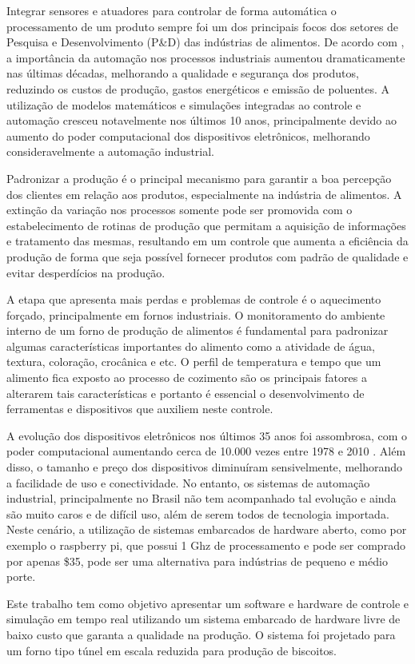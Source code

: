 Integrar sensores e atuadores para controlar de forma automática o processamento de um produto sempre foi um dos principais focos dos setores de Pesquisa e Desenvolvimento (P\&D) das indústrias de alimentos. De acordo com \citet{future-trends}, a importância da automação nos processos industriais aumentou dramaticamente nas últimas décadas, melhorando a qualidade e segurança dos produtos, reduzindo os custos de produção, gastos energéticos e emissão de poluentes. A utilização de modelos matemáticos e simulações integradas ao controle e automação cresceu notavelmente nos últimos 10 anos, principalmente devido ao aumento do poder computacional dos dispositivos eletrônicos, melhorando consideravelmente a automação industrial.

Padronizar a produção é o principal mecanismo para garantir a boa percepção dos clientes em relação aos produtos, especialmente na indústria de alimentos. A extinção da variação nos processos somente pode ser promovida com o estabelecimento de rotinas de produção que permitam a aquisição de informações e tratamento das mesmas, resultando em um controle que aumenta a eficiência da produção de forma que seja possível fornecer produtos com padrão de qualidade e evitar desperdícios na produção.

A etapa que apresenta mais perdas e problemas de controle é o aquecimento forçado, principalmente em fornos industriais. O monitoramento do ambiente interno de um forno de produção de alimentos é fundamental para padronizar algumas características importantes do alimento como a atividade de água, textura, coloração, crocânica e etc. O perfil de temperatura e tempo que um alimento fica exposto ao processo de cozimento são os principais fatores a alterarem tais características e portanto é essencial o desenvolvimento de ferramentas e dispositivos que auxiliem neste controle.

	A evolução dos dispositivos eletrônicos nos últimos 35 anos foi assombrosa, com o poder computacional aumentando cerca de 10.000 vezes entre 1978 e 2010 \citep{history-computer}. Além disso, o tamanho e preço dos dispositivos diminuíram sensivelmente, melhorando a facilidade de uso e conectividade. No entanto, os sistemas de automação industrial, principalmente no Brasil não tem acompanhado tal evolução e ainda são muito caros e de difícil uso, além de serem todos de tecnologia importada. Neste cenário, a utilização de sistemas embarcados de hardware aberto, como por exemplo o raspberry pi\texttrademark, que possui 1 Ghz de processamento e pode ser comprado por apenas \$35, pode ser uma alternativa para indústrias de pequeno e médio porte.
	
	Este trabalho tem como objetivo apresentar um software e hardware de controle e simulação em tempo real utilizando um sistema embarcado de hardware livre de baixo custo que garanta a qualidade na produção. O sistema foi projetado para um forno tipo túnel em escala reduzida para produção de biscoitos. 

